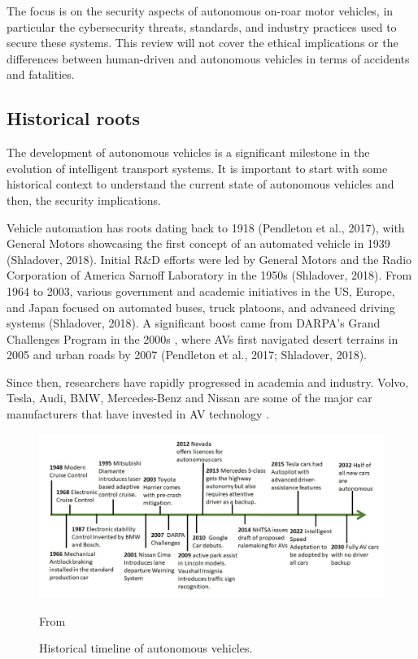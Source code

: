 The focus is on the security aspects of autonomous on-roar motor vehicles,
in particular the cybersecurity threats, standards, and industry practices used to secure these systems.
This review will not cover the ethical implications or the differences between human-driven and autonomous vehicles in terms of accidents and fatalities.

\subsection{Historical roots}\label{subsec:historical-roots}

The development of autonomous vehicles is a significant milestone in the evolution of intelligent transport systems.
It is important to start with some historical context to understand the current state of autonomous vehicles and then,
the security implications.

Vehicle automation has roots dating back to 1918 (Pendleton et al., 2017),
with General Motors showcasing the first concept of an automated vehicle in 1939 (Shladover, 2018).
Initial R\&D efforts were led by General Motors and the Radio Corporation of America Sarnoff Laboratory in the 1950s
(Shladover, 2018).
From 1964 to 2003, various government and academic initiatives in the US, Europe,
and Japan focused on automated buses, truck platoons, and advanced driving systems
(Shladover, 2018).
A significant boost came from DARPA’s Grand Challenges Program in the 2000s \cite{darpa_grand_challenges_book},
where AVs first navigated desert terrains in 2005 and urban roads by 2007 (Pendleton et al., 2017; Shladover, 2018).

Since then, researchers have rapidly progressed in academia and industry.
Volvo, Tesla, Audi, BMW,
Mercedes-Benz and Nissan are some of the major car manufacturers that have invested in AV technology \cite{faisal2019understanding}.

\begin{figure}[!htb]
    \centering
    \includegraphics[width=0.7\linewidth]{figures/history}
    \caption{Historical timeline of autonomous vehicles.}
    \footnotesize{From \cite{ahangar2021survey} }
    \label{fig:history}
\end{figure}

